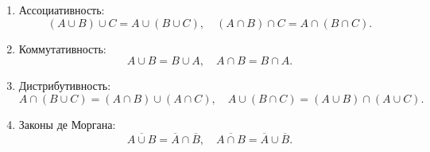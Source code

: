 \begin{enumerate}[label=\arabic*)]
  \item Ассоциативность:
    \[
      (A\cup B)\cup C = A\cup(B\cup C), 
      \quad (A\cap B)\cap C = A\cap(B\cap C).
    \]
  \item Коммутативность:
    \[
      A\cup B = B\cup A, 
      \quad A\cap B = B\cap A.
    \]
  \item Дистрибутивность:
    \[
      A\cap (B\cup C) = (A\cap B)\cup (A\cap C),
      \quad A\cup (B\cap C) = (A\cup B)\cap (A\cup C).
    \]
  \item Законы де Моргана:
    \[
      \overline{A\cup B} = \overline{A}\cap\overline{B},
      \quad \overline{A\cap B} = \overline{A}\cup\overline{B}.
    \]
\end{enumerate}